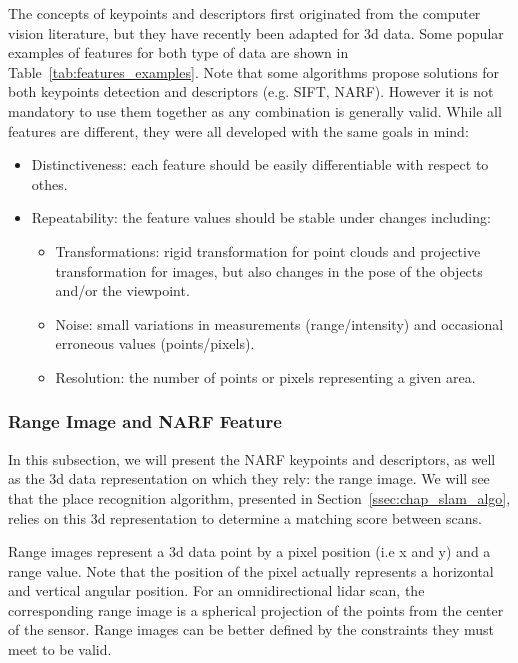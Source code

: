 The concepts of keypoints and descriptors first originated from the computer vision literature, but they have recently been adapted for \gls*{3d} data. Some popular examples of features for both type of data are shown in Table~\ref{tab:features_examples}. Note that some algorithms propose solutions for both keypoints detection and descriptors (e.g. SIFT, NARF). However it is not mandatory to use them together as any combination is generally valid. While all features are different, they were all developed with the same goals in mind:
\begin{itemize}[label=$\bullet$,noitemsep,topsep=0pt]
    \item Distinctiveness: each feature should be easily differentiable with respect to othes.
    \item Repeatability: the feature values should be stable under changes including:
        \begin{itemize}[label=$\circ$,noitemsep,topsep=0pt]
            \item Transformations: rigid transformation for point clouds and projective transformation for images, but also changes in the pose of the objects and/or the viewpoint.
            \item Noise: small variations in measurements (range/intensity) and occasional erroneous values (points/pixels).
            \item Resolution: the number of points or pixels representing a given area.
        \end{itemize}
\end{itemize}


\subsubsection{Range Image and NARF Feature}
\label{ssub:NARF Features and Range Image}

In this subsection, we will present the NARF keypoints and descriptors, as well as the \gls*{3d} data representation on which they rely: the range image. We will see that the place recognition algorithm, presented in Section~\ref{ssec:chap_slam_algo}, relies on this \gls*{3d} representation to determine a matching score between scans.

Range images represent a \gls*{3d} data point by a pixel position (i.e x and y) and a range value. Note that the position of the pixel actually represents a horizontal and vertical angular position. For an omnidirectional \gls*{lidar} scan, the corresponding range image is a spherical projection of the points from the center of the sensor. Range images can be better defined by the constraints they must meet to be valid.

